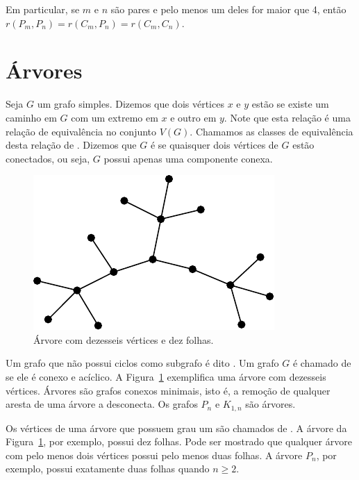 Em particular, se $m$ e $n$ são pares e pelo menos um deles for maior que 4, então $r(P_m, P_n) = r(C_m, P_n) = r(C_m, C_n)$.


\section{Árvores}

Seja $G$ um grafo simples. Dizemos que dois vértices $x$ e $y$ estão  se existe um caminho em $G$ com um extremo em $x$ e outro em $y$. Note que esta relação é uma relação de equivalência no conjunto $V(G)$. Chamamos as classes de equivalência desta relação de . Dizemos que $G$ é  se quaisquer dois vértices de $G$ estão conectados, ou seja, $G$ possui apenas uma componente conexa.

\begin{figure}[ht!]
\centering
\includegraphics{figures/3_graph_4_tree}
\caption{Árvore com dezesseis vértices e dez folhas.}
\label{graph:fig:tree}
\end{figure}

Um grafo que não possui ciclos como subgrafo é dito .
Um grafo $G$ é chamado de  se ele é conexo e acíclico. A Figura~\ref{graph:fig:tree} exemplifica uma árvore com dezesseis vértices. Árvores são grafos conexos minimais, isto é, a remoção de qualquer aresta de uma árvore a desconecta. Os grafos $P_n$ e $K_{1,n}$ são árvores.

Os vértices de uma árvore que possuem grau um são chamados de . A árvore da Figura~\ref{graph:fig:tree}, por exemplo, possui dez folhas. Pode ser mostrado que qualquer árvore com pelo menos dois vértices possui pelo menos duas folhas. A árvore $P_n$, por exemplo, possui exatamente duas folhas quando $n \geq 2$.

